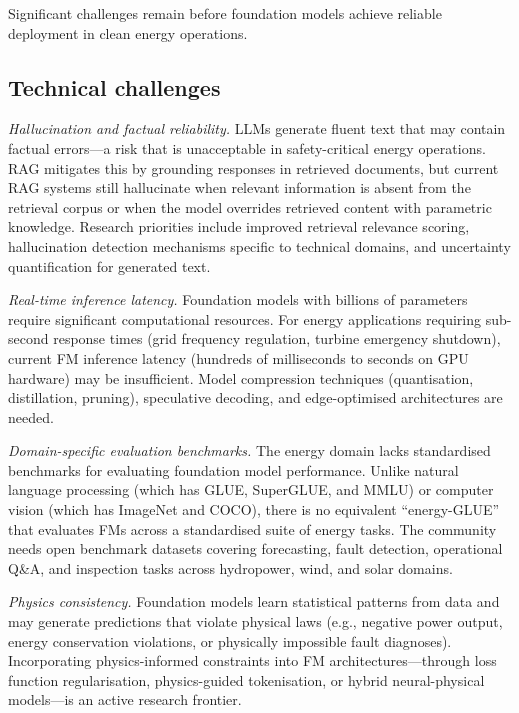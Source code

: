 \documentclass[preprint,12pt]{elsarticle}
\begin{document}
Significant challenges remain before foundation models achieve reliable deployment in clean energy operations.

\subsection{Technical challenges}
\label{subsec:technical_challenges}

\textit{Hallucination and factual reliability.} LLMs generate fluent text that may contain factual errors---a risk that is unacceptable in safety-critical energy operations. RAG mitigates this by grounding responses in retrieved documents, but current RAG systems still hallucinate when relevant information is absent from the retrieval corpus or when the model overrides retrieved content with parametric knowledge. Research priorities include improved retrieval relevance scoring, hallucination detection mechanisms specific to technical domains, and uncertainty quantification for generated text.

\textit{Real-time inference latency.} Foundation models with billions of parameters require significant computational resources. For energy applications requiring sub-second response times (grid frequency regulation, turbine emergency shutdown), current FM inference latency (hundreds of milliseconds to seconds on GPU hardware) may be insufficient. Model compression techniques (quantisation, distillation, pruning), speculative decoding, and edge-optimised architectures are needed.

\textit{Domain-specific evaluation benchmarks.} The energy domain lacks standardised benchmarks for evaluating foundation model performance. Unlike natural language processing (which has GLUE, SuperGLUE, and MMLU) or computer vision (which has ImageNet and COCO), there is no equivalent ``energy-GLUE'' that evaluates FMs across a standardised suite of energy tasks. The community needs open benchmark datasets covering forecasting, fault detection, operational Q\&A, and inspection tasks across hydropower, wind, and solar domains.

\textit{Physics consistency.} Foundation models learn statistical patterns from data and may generate predictions that violate physical laws (e.g., negative power output, energy conservation violations, or physically impossible fault diagnoses). Incorporating physics-informed constraints into FM architectures---through loss function regularisation, physics-guided tokenisation, or hybrid neural-physical models---is an active research frontier.
\end{document}
